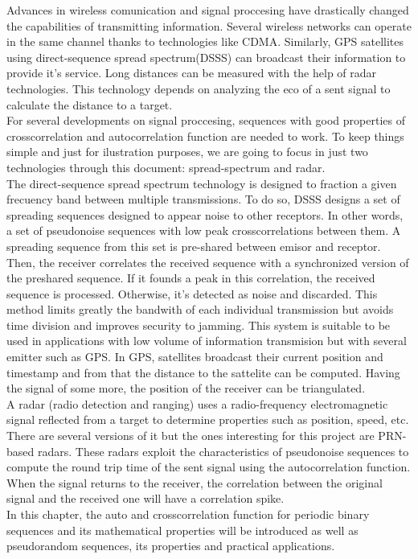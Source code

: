 Advances in wireless comunication and signal proccesing have drastically
changed the capabilities of transmitting information. Several wireless
networks can operate in the same channel thanks to technologies like
CDMA. Similarly, GPS\cite{GPS} satellites using direct-sequence spread
spectrum(DSSS) can broadcast their information to provide it's service. Long
distances can be measured with the help of radar technologies. This
technology depends on analyzing the eco of a sent signal to calculate the
distance to a target.\\

For several developments on signal proccesing, sequences with good properties
of crosscorrelation and autocorrelation function are needed to work. To keep
things simple and just for ilustration purposes, we are going to focus in just
two technologies through this document: spread-spectrum and radar.\\

The direct-sequence spread spectrum technology\cite{DSSS_1}\cite{DSSS} is
designed to fraction a given frecuency band between multiple transmissions. To
do so, DSSS designs a set of spreading sequences designed to appear noise to
other receptors. In other words, a set of pseudonoise sequences with low peak
crosscorrelations between them. A spreading sequence from this set is pre-shared between emisor and receptor. Then, the receiver correlates the received
sequence with a synchronized version of the preshared sequence. If it founds a
peak in this correlation, the received sequence is processed. Otherwise, it's
detected as noise and discarded. This method limits greatly the bandwith of
each individual transmission but avoids time division and improves security to
jamming. This system is suitable to be used in applications with low volume
of information transmision but with several emitter such as GPS. In GPS,
satellites broadcast their current position and timestamp and from that
the distance to the sattelite can be computed. Having the signal of some more,
the position of the receiver can be triangulated.\\

A radar (radio detection and ranging) uses a radio-frequency electromagnetic
signal reflected from a target to determine properties such as position, speed,
etc. There are several versions of it but the ones interesting for this
project are PRN-based radars\cite{prn_radar_example1}\cite{prn_radar_example2}.
These radars exploit the characteristics of pseudonoise sequences to compute the
round trip time of the sent signal using the autocorrelation function. When
the signal returns to the receiver, the correlation between the original
signal and the received one will have a correlation spike.\\

In this chapter, the auto and crosscorrelation function for
periodic binary sequences and its mathematical properties will be introduced
as well as pseudorandom sequences, its properties and practical applications.

 

